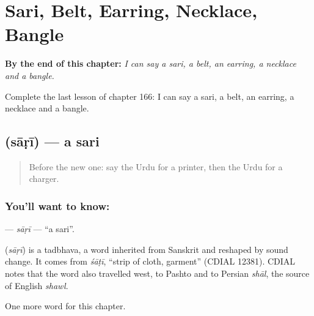 
\chapter{Sari, Belt, Earring, Necklace, Bangle}
\label{ch:ur-sari-belt-earring-necklace-bangle}

\begin{chapteropening}
\textbf{By the end of this chapter:} \emph{I can say a sari, a belt, an earring, a necklace and a bangle.}

Complete the last lesson of chapter 166: I can say a sari, a belt, an earring, a necklace and a bangle.
\end{chapteropening}

\section[\texorpdfstring{\ur{ساڑی} (sāṛī)}{ساڑی (sāṛī)}]{ (sāṛī) — a sari}

\label{lesson:UR-C166-sari}



\begin{quote}
Before the new one: say the Urdu for a printer, then the Urdu for a charger.
\end{quote}

\subsection*{You'll want to know: }
\textbf{} — \emph{sāṛī} — \textquotedblleft{}a sari\textquotedblright{}.

\begin{cousinweb}
\textbf{} (\emph{sāṛī}) is a tadbhava, a word inherited from Sanskrit and reshaped by sound change. It comes from \emph{śāṭī}, \textquotedblleft{}strip of cloth, garment\textquotedblright{} (CDIAL 12381). CDIAL notes that the word also travelled west, to Pashto and to Persian \emph{shāl}, the source of English \emph{shawl}.
\end{cousinweb}

\begin{grammarlens}[title={What you've built}]
One more word for this chapter.
\end{grammarlens}

